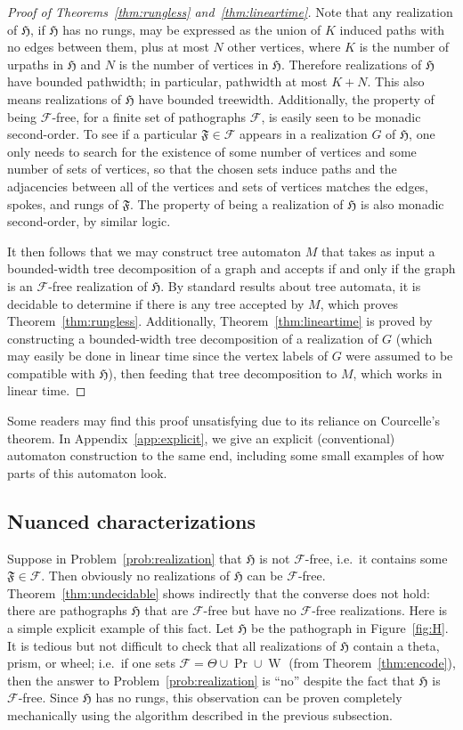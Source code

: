\documentclass{article}
\newcommand{\Fc}{\mathcal{F}}
\newcommand{\Ff}{\mathfrak{F}}
\newcommand{\Hf}{\mathfrak{H}}
\DeclareMathOperator{\W}{W}
\begin{document}
\begin{proof}[Proof of Theorems~\ref{thm:rungless} and~\ref{thm:lineartime}]
Note that any realization of $\Hf$, if $\Hf$ has no rungs, may be expressed as the union of $K$ induced paths with no edges between them, plus at most $N$ other vertices, where $K$ is the number of urpaths in $\Hf$ and $N$ is the number of vertices in $\Hf$. Therefore realizations of $\Hf$ have bounded pathwidth; in particular, pathwidth at most $K+N$. This also means realizations of $\Hf$ have bounded treewidth. Additionally, the property of being $\Fc$-free, for a finite set of pathographs $\Fc$, is easily seen to be monadic second-order. To see if a particular $\Ff\in \Fc$ appears in a realization $G$ of $\Hf$, one only needs to search for the existence of some number of vertices and some number of sets of vertices, so that the chosen sets induce paths and the adjacencies between all of the vertices and sets of vertices matches the edges, spokes, and rungs of $\Ff$. The property of being a realization of $\Hf$ is also monadic second-order, by similar logic.

It then follows that we may construct tree automaton $M$ that takes as input a bounded-width tree decomposition of a graph and accepts if and only if the graph is an $\Fc$-free realization of $\Hf$. By standard results about tree automata, it is decidable to determine if there is any tree accepted by $M$, which proves Theorem~\ref{thm:rungless}. Additionally, Theorem~\ref{thm:lineartime} is proved by constructing a bounded-width tree decomposition of a realization of $G$ (which may easily be done in linear time since the vertex labels of $G$ were assumed to be compatible with $\Hf$), then feeding that tree decomposition to $M$, which works in linear time.
\end{proof}

Some readers may find this proof unsatisfying due to its reliance on Courcelle's theorem. In Appendix~\ref{app:explicit}, we give an explicit (conventional) automaton construction to the same end, including some small examples of how parts of this automaton look.

\subsection{Nuanced characterizations}
\label{ssec:misc}

Suppose in Problem~\ref{prob:realization} that $\Hf$ is not $\Fc$-free, i.e.\ it contains some $\Ff\in \Fc$. Then obviously no realizations of $\Hf$ can be $\Fc$-free. Theorem~\ref{thm:undecidable} shows indirectly that the converse does not hold: there are pathographs $\Hf$ that are $\Fc$-free but have no $\Fc$-free realizations. Here is a simple explicit example of this fact. Let $\Hf$ be the pathograph in Figure~\ref{fig:H}. It is tedious but not difficult to check that all realizations of $\Hf$ contain a theta, prism, or wheel; i.e.\  if one sets $\Fc=\Theta\cup \Pr\cup \W$ (from Theorem~\ref{thm:encode}), then the answer to Problem~\ref{prob:realization} is ``no'' despite the fact that $\Hf$ is $\Fc$-free. Since $\Hf$ has no rungs, this observation can be proven completely mechanically using the algorithm described in the previous subsection.
\end{document}
